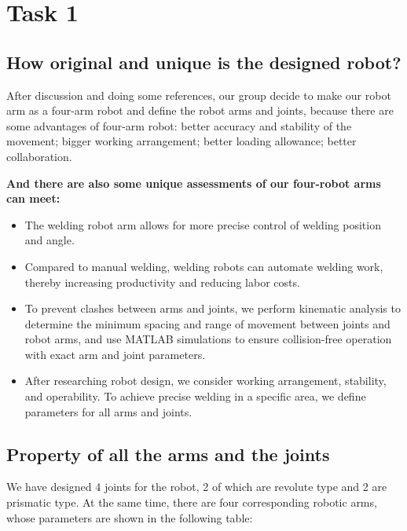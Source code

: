 \section{Task 1}
\FloatBarrier %


\subsection{How original and unique is the designed robot?}


After discussion and doing some references, our group decide to make our robot arm as a four-arm robot and define the robot arms and joints, because there are some advantages of four-arm robot: better accuracy and stability of the movement; bigger working arrangement; better loading allowance; better collaboration.

\textbf{And there are also some unique assessments of our four-robot arms can meet:}
\begin{itemize}
    \item The welding robot arm allows for more precise control of welding position and angle.
    \item Compared to manual welding, welding robots can automate welding work, thereby increasing productivity and reducing labor costs.
    \item To prevent clashes between arms and joints, we perform kinematic analysis to determine the minimum spacing and range of movement between joints and robot arms, and use MATLAB simulations to ensure collision-free operation with exact arm and joint parameters.
    \item After researching robot design, we consider working arrangement, stability, and operability. To achieve precise welding in a specific area, we define parameters for all arms and joints.
\end{itemize}

\subsection{Property of all the arms and the joints}

We have designed 4 joints for the robot, 2 of which are revolute type and 2 are prismatic type. At the same time, there are four corresponding robotic arms, whose parameters are shown in the following table:

